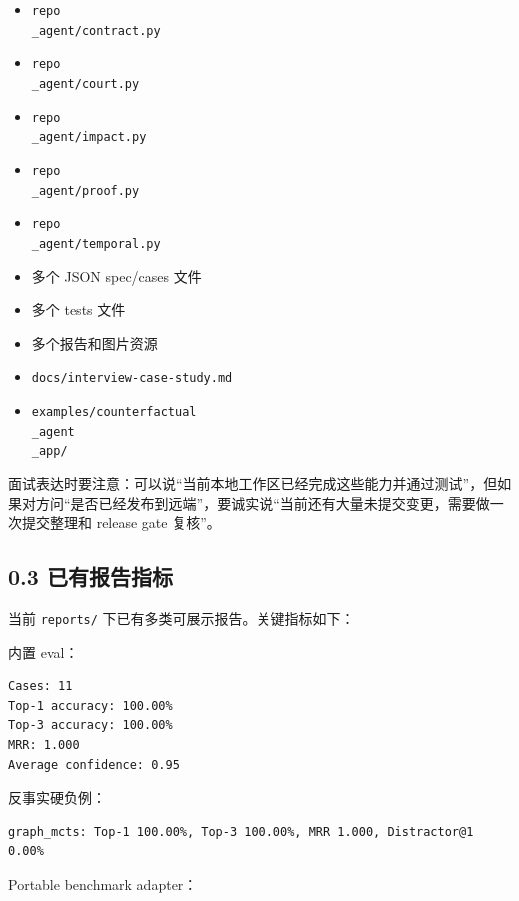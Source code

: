 \documentclass[UTF8,12pt,openany]{ctexbook}
\begin{document}
\begin{itemize}
\item \texttt{repo\\_agent/contract.py}
\item \texttt{repo\\_agent/court.py}
\item \texttt{repo\\_agent/impact.py}
\item \texttt{repo\\_agent/proof.py}
\item \texttt{repo\\_agent/temporal.py}
\item 多个 JSON spec/cases 文件
\item 多个 tests 文件
\item 多个报告和图片资源
\item \texttt{docs/interview-case-study.md}
\item \texttt{examples/counterfactual\\_agent\\_app/}
\end{itemize}

面试表达时要注意：可以说“当前本地工作区已经完成这些能力并通过测试”，但如果对方问“是否已经发布到远端”，要诚实说“当前还有大量未提交变更，需要做一次提交整理和 release gate 复核”。\par

\subsection{0.3 已有报告指标}

当前 \texttt{reports/} 下已有多类可展示报告。关键指标如下：\par

内置 eval：\par

\begin{lstlisting}
Cases: 11
Top-1 accuracy: 100.00%
Top-3 accuracy: 100.00%
MRR: 1.000
Average confidence: 0.95
\end{lstlisting}

反事实硬负例：\par

\begin{lstlisting}
graph_mcts: Top-1 100.00%, Top-3 100.00%, MRR 1.000, Distractor@1 0.00%
\end{lstlisting}

Portable benchmark adapter：\par
\end{document}
